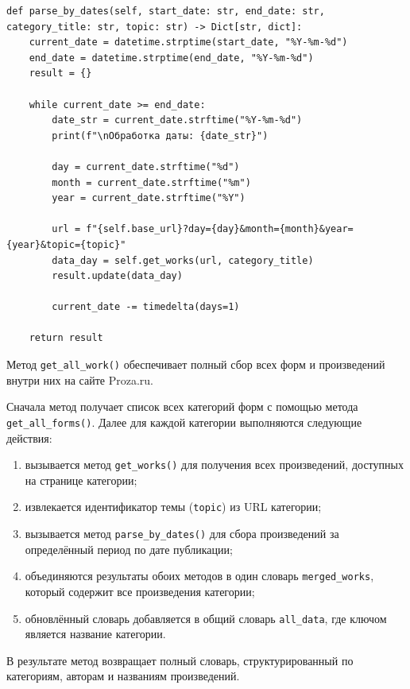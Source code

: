 \documentclass[coursework]{SCWorks}
\begin{document}
    \begin{verbatim}
def parse_by_dates(self, start_date: str, end_date: str, category_title: str, topic: str) -> Dict[str, dict]:
    current_date = datetime.strptime(start_date, "%Y-%m-%d")
    end_date = datetime.strptime(end_date, "%Y-%m-%d")
    result = {}

    while current_date >= end_date:
        date_str = current_date.strftime("%Y-%m-%d")
        print(f"\nОбработка даты: {date_str}")

        day = current_date.strftime("%d")
        month = current_date.strftime("%m")
        year = current_date.strftime("%Y")

        url = f"{self.base_url}?day={day}&month={month}&year={year}&topic={topic}"
        data_day = self.get_works(url, category_title)
        result.update(data_day)

        current_date -= timedelta(days=1)

    return result
    \end{verbatim}

    Метод \texttt{get\_all\_work()} обеспечивает полный сбор всех форм и произведений внутри них на сайте Proza.ru.

    Сначала метод получает список всех категорий форм с помощью метода \texttt{get\_all\_forms()}.
    Далее для каждой категории выполняются следующие действия:
    \begin{enumerate}
        \item вызывается метод \texttt{get\_works()} для получения всех произведений, доступных на странице категории;
        \item извлекается идентификатор темы (\texttt{topic}) из URL категории;
        \item вызывается метод \texttt{parse\_by\_dates()} для сбора произведений за определённый период по дате публикации;
        \item объединяются результаты обоих методов в один словарь \texttt{merged\_works}, который содержит все произведения категории;
        \item обновлённый словарь добавляется в общий словарь \texttt{all\_data}, где ключом является название категории.
    \end{enumerate}

    В результате метод возвращает полный словарь, структурированный по категориям, авторам и названиям произведений.
\end{document}
